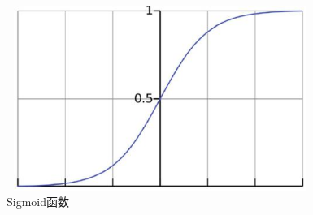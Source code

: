 \begin{figure}[h]
  \centering
  \includegraphics[width=10cm, height=6cm]{Img/sigmoid.jpg}
  \caption{Sigmoid函数}
  \label{fig:sigmoid}
\end{figure}

